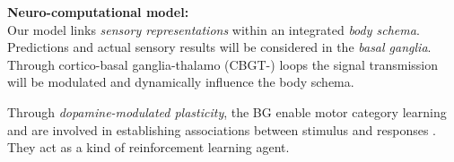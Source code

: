 \documentclass[portrait,final,a0paper,fontscale=0.33]{baposter}
\begin{document}
\begin{poster}
{\begin{adjustbox}{minipage=0.95\textwidth, margin=5pt, center}
\begin{minipage}[l]{\textwidth}
		\textbf{Neuro-computational model:} \\
		Our model links \textit{sensory representations} within an integrated \textit{body schema}. Predictions and actual sensory results will be considered in the \textit{basal ganglia}. Through cortico-basal ganglia-thalamo (CBGT-) loops the signal transmission will be modulated and dynamically influence the body schema. 
		
		Through \textit{dopamine-modulated plasticity}, the BG enable motor category learning \parencite{segerHowBasalGanglia2008a} and are involved in establishing associations between stimulus and responses \parencite{packardLearningMemoryFunctions2002a}. They act as a kind of reinforcement learning agent.

	\end{minipage}

	\end{adjustbox}
}


\end{poster}
\end{document}
